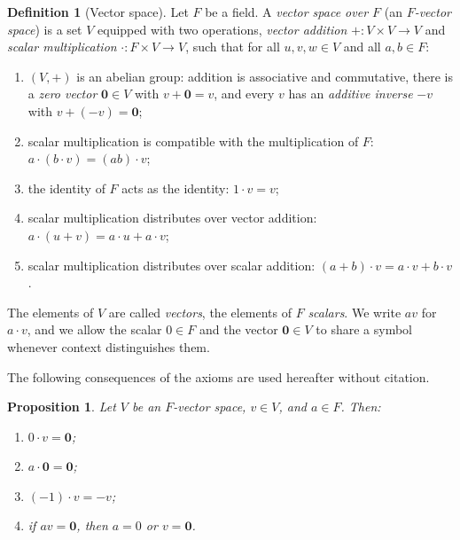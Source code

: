 \documentclass[11pt,a4paper]{article}
\newtheorem{proposition}[theorem]{Proposition}
\theoremstyle{definition}
\newtheorem{definition}[theorem]{Definition}
\theoremstyle{remark}
\begin{document}
\begin{definition}[Vector space]\label{linalg:def-vs}
Let \(F\) be a field. A \emph{vector space over \(F\)} (an
\emph{\(F\)-vector space}) is a set \(V\) equipped with two operations,
\emph{vector addition} \(+\colon V \times V \to V\) and \emph{scalar
multiplication} \(\cdot\colon F \times V \to V\), such that for all
\(u, v, w \in V\) and all \(a, b \in F\):
\begin{enumerate}
\item \((V, +)\) is an abelian group: addition is associative and
  commutative, there is a \emph{zero vector} \(\mathbf 0 \in V\) with
  \(v + \mathbf 0 = v\), and every \(v\) has an \emph{additive inverse}
  \(-v\) with \(v + (-v) = \mathbf 0\);
\item scalar multiplication is compatible with the multiplication of
  \(F\): \(a \cdot (b \cdot v) = (ab) \cdot v\);
\item the identity of \(F\) acts as the identity: \(1 \cdot v = v\);
\item scalar multiplication distributes over vector addition:
  \(a \cdot (u + v) = a \cdot u + a \cdot v\);
\item scalar multiplication distributes over scalar addition:
  \((a + b) \cdot v = a \cdot v + b \cdot v\).
\end{enumerate}
The elements of \(V\) are called \emph{vectors}, the elements of \(F\)
\emph{scalars}. We write \(av\) for \(a \cdot v\), and we allow the
scalar \(0 \in F\) and the vector \(\mathbf 0 \in V\) to share a symbol
whenever context distinguishes them.
\end{definition}

The following consequences of the axioms are used hereafter without
citation.

\begin{proposition}\label{linalg:prop-vs-basic}
Let \(V\) be an \(F\)-vector space, \(v \in V\), and \(a \in F\). Then:
\begin{enumerate}
\item \(0 \cdot v = \mathbf 0\);
\item \(a \cdot \mathbf 0 = \mathbf 0\);
\item \((-1) \cdot v = -v\);
\item if \(av = \mathbf 0\), then \(a = 0\) or \(v = \mathbf 0\).
\end{enumerate}
\end{proposition}
\end{document}
